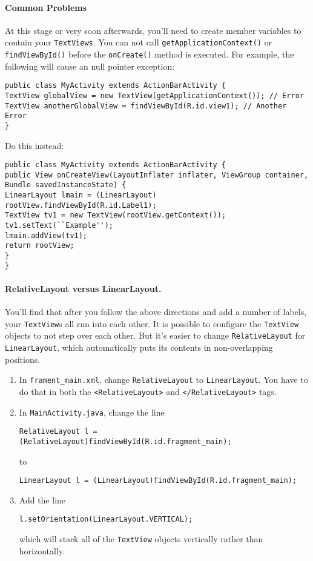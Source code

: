 \documentclass[10pt]{article}
\begin{document}
\paragraph{Common Problems}
At this stage or very soon afterwards, you'll need to create member variables to contain your {\tt TextViews}. You can not call {\tt getApplicationContext()} or {\tt findViewById()} before the {\tt onCreate()} method is executed. For example, the following will cause an null pointer exception:
\begin{verbatim}
public class MyActivity extends ActionBarActivity {
TextView globalView = new TextView(getApplicationContext()); // Error
TextView anotherGlobalView = findViewById(R.id.view1); // Another Error
}
\end{verbatim} \vspace*{-1em}
Do this instead:
\begin{verbatim}
public class MyActivity extends ActionBarActivity {
public View onCreateView(LayoutInflater inflater, ViewGroup container,
Bundle savedInstanceState) {
LinearLayout lmain = (LinearLayout) rootView.findViewById(R.id.Label1);
TextView tv1 = new TextView(rootView.getContext());
tv1.setText(``Example'');
lmain.addView(tv1);
return rootView;
}
}
\end{verbatim} \vspace*{-1em}
\paragraph{RelativeLayout versus LinearLayout.} You'll find
that after you follow the above directions and add a number of labels, your {\tt TextView}s all run into each other. It is possible to configure the {\tt TextView} objects to not step over each other. But it's easier to change {\tt RelativeLayout} for {\tt LinearLayout}, which automatically puts its contents in non-overlapping positions.
\begin{enumerate}
\item In {\tt frament\_main.xml}, change {\tt RelativeLayout} to {\tt LinearLayout}. You have to do that in both the \verb+<RelativeLayout>+ and \verb+</RelativeLayout>+ tags.
\item In {\tt MainActivity.java}, change the line \vspace*{-1em}
\begin{verbatim}
RelativeLayout l = (RelativeLayout)findViewById(R.id.fragment_main);
\end{verbatim} \vspace*{-1em}
to
\vspace*{-1em} \begin{verbatim}
LinearLayout l = (LinearLayout)findViewById(R.id.fragment_main);
\end{verbatim}
\item Add the line \vspace*{-1em}
\begin{verbatim}
l.setOrientation(LinearLayout.VERTICAL);
\end{verbatim} \vspace*{-1em}
which will stack all of the {\tt TextView} objects vertically rather than horizontally.
\end{enumerate}
\end{document}
